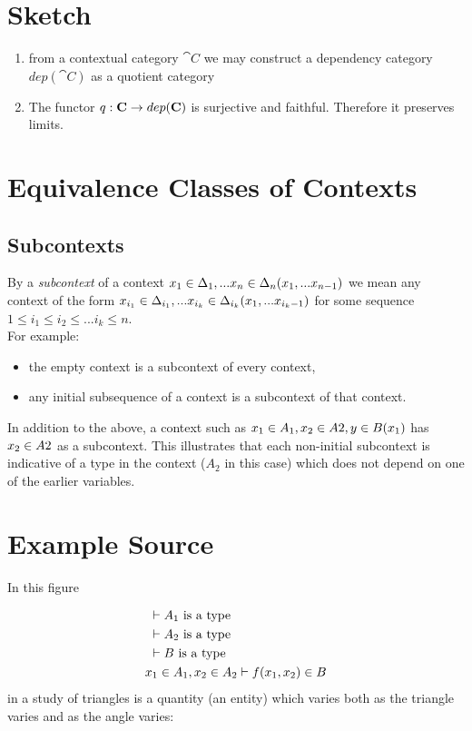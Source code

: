 \documentclass[10pt,a4paper]{scrartcl}
\begin{document}
\newpage

\section{Sketch}
\begin{enumerate}
\item{
from a contextual category $\cat{C}$ we may construct a dependency category $dep(\cat{C})$ as a quotient category
}
\item{
The functor $q:\textbf{C} \rightarrow dep(\textbf{C})$ is surjective and faithful.
Therefore it preserves limits.
}
\end{enumerate}




\section{Equivalence Classes of Contexts}
\subsection{Subcontexts}
By a \textit{subcontext} of a context $x_1 \in \Delta_1,... x_{n} \in \Delta_{n}(x_1,...x_{n-1})$ we mean any context
of the form
$x_{i_1} \in {\Delta}_{i_1},... x_{i_k} \in {\Delta}_{i_k}(x_1,...x_{i_k-1})$ for some sequence 
$1 \leq i_1 \leq i_2 \leq ... i_k \leq n$. \\

\noindent
For example:
\begin {itemize}


\item the empty context  is a subcontext of every 
context,
\item any initial subsequence of a context is a subcontext of that context.
\end{itemize}

\noindent
In addition to the above, a context such as $x_1 \in A_1,x_2 \in A2,y \in B(x_1)$ has 
$x_2 \in A2$ as a subcontext. This illustrates that each non-initial subcontext is indicative of a type in the context ($A_2$ in this case)
which does not depend on one of the earlier variables.
 

\section{Example Source}
\noindent In this figure

\begin{align*}
&\text{                                  }\vdash A_1\mbox{ is a type} \\
&\text{                                  }\vdash A_2\mbox{ is a type} \\
&\text{                                  }\vdash B\mbox{ is a type} \\
&x_1 \in A_1,x_2 \in A_2 \vdash f(x_1,x_2) \in B 
\end{align*}
\noindent
 in a study of triangles is a quantity (an entity)  which varies both as the triangle varies and as the angle varies:
\end{document}
